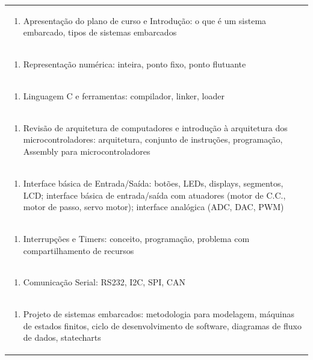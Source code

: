\documentclass[11pt]{article}
\begin{document}
\begin{center}
\begin{longtable}{|p{4cm}|p{4cm}|p{4cm}|p{4cm}|}
\multicolumn{4}{|p{\dimexpr 16cm + 6\tabcolsep\relax}|}{\begin{enumerate}[start=1]\item Apresentação do plano de curso e Introdução: o que é um sistema embarcado, tipos de sistemas embarcados\end{enumerate}}\\
\multicolumn{4}{|p{\dimexpr 16cm + 6\tabcolsep\relax}|}{\begin{enumerate}[start=2]\item Representação numérica: inteira, ponto fixo, ponto flutuante\end{enumerate}}\\
\multicolumn{4}{|p{\dimexpr 16cm + 6\tabcolsep\relax}|}{\begin{enumerate}[start=3]\item Linguagem C e ferramentas: compilador, linker, loader\end{enumerate}}\\
\multicolumn{4}{|p{\dimexpr 16cm + 6\tabcolsep\relax}|}{\begin{enumerate}[start=4]\item Revisão de arquitetura de computadores e introdução à arquitetura dos microcontroladores: arquitetura, conjunto de instruções, programação, Assembly para microcontroladores\end{enumerate}}\\
\multicolumn{4}{|p{\dimexpr 16cm + 6\tabcolsep\relax}|}{\begin{enumerate}[start=5]\item Interface básica de Entrada/Saída: botões, LEDs, displays, segmentos, LCD; interface básica de entrada/saída com atuadores (motor de C.C., motor de passo, servo motor); interface analógica (ADC, DAC, PWM)\end{enumerate}}\\
\multicolumn{4}{|p{\dimexpr 16cm + 6\tabcolsep\relax}|}{\begin{enumerate}[start=6]\item Interrupções e Timers: conceito, programação, problema com compartilhamento de recursos\end{enumerate}}\\
\multicolumn{4}{|p{\dimexpr 16cm + 6\tabcolsep\relax}|}{\begin{enumerate}[start=7]\item Comunicação Serial: RS232, I2C, SPI, CAN\end{enumerate}}\\
\multicolumn{4}{|p{\dimexpr 16cm + 6\tabcolsep\relax}|}{\begin{enumerate}[start=8]\item Projeto de sistemas embarcados: metodologia para modelagem, máquinas de estados finitos, ciclo de desenvolvimento de software, diagramas de fluxo de dados, statecharts\end{enumerate}}\\

\end{longtable}
\end{center}
\end{document}

